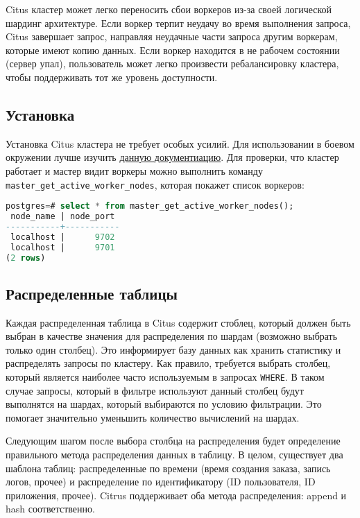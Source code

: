 Citus кластер может легко переносить сбои воркеров из-за своей логической шардинг архитектуре. Если воркер терпит неудачу во время выполнения запроса, Citus завершает запрос, направляя неудачные части запроса другим воркерам, которые имеют копию данных. Если воркер находится в не рабочем состоянии (сервер упал), пользователь может легко произвести ребалансировку кластера, чтобы поддерживать тот же уровень доступности.


\subsection{Установка}

Установка Citus кластера не требует особых усилий. Для использовании в боевом окружении лучше изучить \href{https://docs.citusdata.com/en/latest/installation/production.html}{данную документиацию}. Для проверки, что кластер работает и мастер видит воркеры можно выполнить команду \lstinline!master_get_active_worker_nodes!, которая покажет список воркеров:

\begin{lstlisting}[language=SQL,label=lst:citus1,caption=Список воркеров]
postgres=# select * from master_get_active_worker_nodes();
 node_name | node_port
-----------+-----------
 localhost |      9702
 localhost |      9701
(2 rows)
\end{lstlisting}


\subsection{Распределенные таблицы}

Каждая распределенная таблица в Citus содержит стоблец, который должен быть выбран в качестве значения для распределения по шардам (возможно выбрать только один столбец). Это информирует базу данных как хранить статистику и распределять запросы по кластеру. Как правило, требуется выбрать столбец, который является наиболее часто используемым в запросах \lstinline!WHERE!. В таком случае запросы, который в фильтре используют данный столбец будут выполнятся на шардах, который выбираются по условию фильтрации. Это помогает значительно уменьшить количество вычислений на шардах.

Следующим шагом после выбора столбца на распределения будет определение правильного метода распределения данных в таблицу. В целом, существует два шаблона таблиц: распределенные по времени (время создания заказа, запись логов, прочее) и распределение по идентификатору (ID пользователя, ID приложения, прочее). Citrus поддерживает оба метода распределения: append и hash соответственно.


